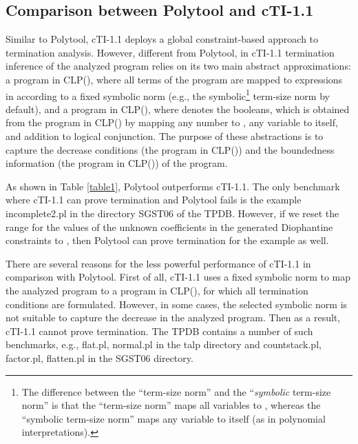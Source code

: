 \documentclass[envcountsame]{tlp}
\newcounter{ex:der-lastsymconsctr}
\begin{document}
\subsection{Comparison between \textsf{Polytool} and \textsf{cTI-1.1}}
\label{polytool-cti}

Similar to \textsf{Polytool}, \textsf{cTI-1.1} deploys a global constraint-based approach to termination
analysis. However, different from \textsf{Polytool}, in \textsf{cTI-1.1} termination
inference of the analyzed program relies on its two main abstract
approximations: a program in \textsf{CLP()}, where all terms of
the program are mapped to expressions in  according to a fixed
symbolic norm (e.g., the symbolic\footnote{The difference between the
``term-size norm'' and the ``\emph{symbolic} term-size norm'' is that the
``term-size norm'' maps all variables to , whereas the
``symbolic term-size norm'' maps any variable to itself (as in polynomial
interpretations).}
term-size norm by default), and a program in
\textsf{CLP()}, where  denotes the booleans, which is obtained from the
program in \textsf{CLP()} by mapping any number to
	, any variable to itself, and addition to logical conjunction. The
		purpose of these abstractions is to capture the decrease conditions
		(the program in \textsf{CLP()}) and the boundedness information
			(the program in \textsf{CLP()}) of the program.

As shown in Table \ref{table1}, \textsf{Polytool} outperforms
\textsf{cTI-1.1}. The only benchmark where \textsf{cTI-1.1} can prove
termination and \textsf{Polytool} fails is the example
\textsf{incomplete2.pl} in the directory \textsf{SGST06} of the TPDB. 
However, if we reset the range for the values of the unknown coefficients in the
generated Diophantine constraints to , then \textsf{Polytool}
can prove termination for the example as well.

There are several reasons for the less powerful performance of \textsf{cTI-1.1}
in comparison with \textsf{Polytool}.  
First of all, \textsf{cTI-1.1} uses a fixed symbolic norm 
to map the analyzed program to a program in
\textsf{CLP()}, for which all termination conditions are
formulated. However, in some cases, the selected symbolic norm is not suitable
to capture the decrease in the analyzed program. Then as
a result, \textsf{cTI-1.1} cannot prove termination. The TPDB
contains a number of such benchmarks, e.g., \textsf{flat.pl},
\textsf{normal.pl} in the \textsf{talp} directory and
 \textsf{countstack.pl}, \textsf{factor.pl},
\textsf{flatten.pl} in the \textsf{SGST06} directory.
\end{document}
